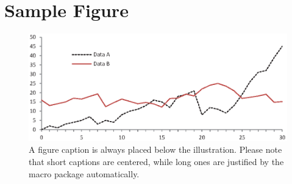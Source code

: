 \section{Sample Figure}
\begin{figure}
    \includegraphics[width=\textwidth]{figures/fig1.eps}
    \caption{A figure caption is always placed below the illustration.
        Please note that short captions are centered, while long ones are
        justified by the macro package automatically.} \label{fig1}
\end{figure}
